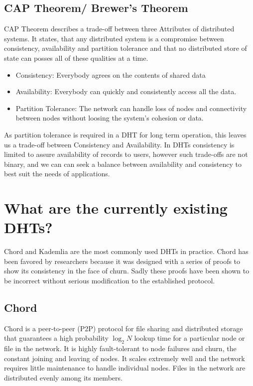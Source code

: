 \subsection{CAP Theorem/ Brewer’s Theorem}
CAP Theorem describes a trade-off between three Attributes of distributed systems.
It states, that any distributed system is a compromise between consistency, availability and partition tolerance and that no distributed store of state can posses all of these qualities at a time.
\begin{itemize}
\item Consistency: Everybody agrees on the contents of shared data
\item Availability: Everybody can quickly and consistently access all the data.
\item Partition Tolerance: The network can handle loss of nodes and connectivity between nodes without loosing the system's cohesion or data.
\end{itemize}

As partition tolerance is required in a DHT for long term operation, this leaves us a trade-off between Consistency and Availability.
In DHTs consistency is limited to assure availability of records to users, however such trade-offs are not binary, and we can can seek a balance between availability and consistency to best suit the needs of applications.


\section{What are the currently existing DHTs?}

Chord and Kademlia are the most commonly used DHTs in practice. 
Chord has been favored by researchers because it was designed with a series of proofs to show its consistency in the face of churn.
Sadly these proofs have been shown to be incorrect\cite{} without serious modification to the established protocol.


\subsection{Chord}
Chord\cite{chord} is a peer-to-peer (P2P) protocol for file sharing and distributed storage that guarantees a high probability $\log_{2} N$ lookup time for a particular node or file in the network. 
It is highly fault-tolerant to node failures and churn, the constant joining and leaving of nodes.  It scales extremely well and the network requires little maintenance to handle individual nodes.  
Files in the network are distributed evenly among its members.

